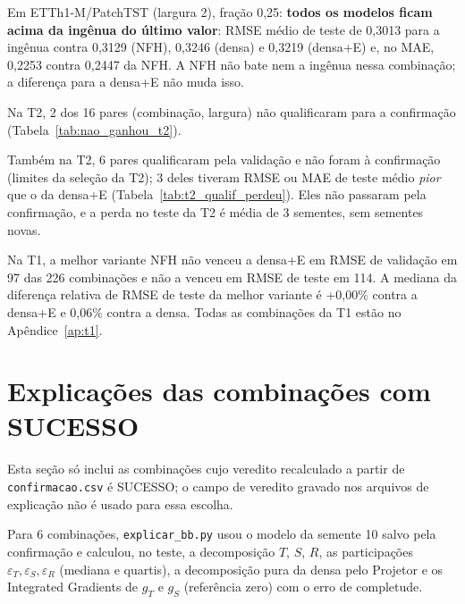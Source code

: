 \documentclass[11pt,a4paper]{article}
\begin{document}
Em ETTh1-M/PatchTST (largura 2), fração 0,25: \textbf{todos os modelos ficam acima da ingênua do último valor}: RMSE médio de teste de 0,3013 para a ingênua contra 0,3129 (NFH), 0,3246 (densa) e 0,3219 (densa+E) e, no MAE, 0,2253 contra 0,2447 da NFH. A NFH não bate nem a ingênua nessa combinação; a diferença para a densa+E não muda isso.

Na T2, 2 dos 16 pares (combinação, largura) não qualificaram para a confirmação (Tabela~\ref{tab:nao_ganhou_t2}).



Também na T2, 6 pares qualificaram pela validação e não foram à confirmação (limites da seleção da T2); 3 deles tiveram RMSE ou MAE de teste médio \emph{pior} que o da densa+E (Tabela~\ref{tab:t2_qualif_perdeu}). Eles não passaram pela confirmação, e a perda no teste da T2 é média de 3 sementes, sem sementes novas.



Na T1, a melhor variante NFH não venceu a densa+E em RMSE de validação em 97 das 226 combinações e não a venceu em RMSE de teste em 114. A mediana da diferença relativa de RMSE de teste da melhor variante é +0,00\% contra a densa+E e \textminus{}0,06\% contra a densa. Todas as combinações da T1 estão no Apêndice~\ref{ap:t1}.

\section{Explicações das combinações com SUCESSO}
Esta seção só inclui as combinações cujo veredito recalculado a partir de \texttt{confirmacao.csv} é SUCESSO; o campo de veredito gravado nos arquivos de explicação não é usado para essa escolha.

Para 6 combinações, \texttt{explicar\_bb.py} usou o modelo da semente 10 salvo pela confirmação e calculou, no teste, a decomposição $T$, $S$, $R$, as participações $\varepsilon_T,\varepsilon_S,\varepsilon_R$ (mediana e quartis), a decomposição pura da densa pelo Projetor e os Integrated Gradients de $g_T$ e $g_S$ (referência zero) com o erro de completude.


\end{document}
